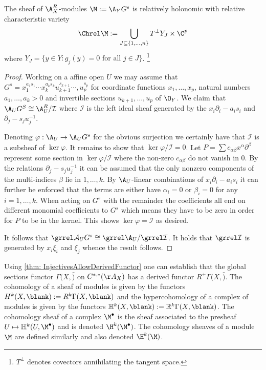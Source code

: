 \begin{lemma}\label{lem: RelHolGs}
  The sheaf of $\A_X^R$-modules $\M := \A_Y G^s$ is relatively holonomic with relative characteristic variety
  $$\Chrel \M := \bigcup_{J\subseteq \{1,\ldots, n\}} T^\perp Y_J \times \C^p $$
  where $Y_J = \{y\in Y: g_j(y) = 0  \text{ for all }j\in J \}$. \footnote{$T^\perp$ denotes covectors annihilating the tangent space. }
\end{lemma}
\begin{proof}
  Working on a affine open $U$ we may assume that $G^s=x_1^{a_1s_1}\cdots x_k^{a_k s_k} u_{k+1}^{s_{k+1}} \cdots, u_{p}^{s_p}$ for coordinate functions $x_1,\ldots, x_p$, natural numbers $a_1,\ldots, a_k>0$ and invertible sections $u_{k+1},\ldots,u_{p}$ of $\O_Y$.
  We claim that $\A_U G^S \cong \A_U^R/\mathcal{I}$ where $\mathcal{I}$ is the left ideal sheaf generated by the $x_i\partial_i - a_is_i$ and $\partial_{j} - s_{j}u_j^{-1}$.

  Denoting $\varphi:\A_U \to \A_U G^s$ for the obvious surjection we certainly have that $\mathcal{I}$ is a subsheaf of $\ker \varphi$.
  It remains to show that $\ker\varphi / \mathcal{I} = 0$.
  Let $P=\sum c_{\alpha \beta} x^\alpha \partial^\beta$ represent some section in $\ker \varphi/\mathcal{I}$ where the non-zero $c_{\alpha \beta}$ do not vanish in $0$.
  By the relations $\partial_{j} - s_{j}u_j^{-1}$ it can be assumed that the only nonzero components of the multi-indices $\beta$ lie in $1,\ldots, k$.
  By $\A_U$-linear combinations of $x_i \partial_i - a_is_i$ it can further be enforced that the terms are either have $\alpha_i = 0$ or $\beta_i = 0$ for any $i=1,\ldots, k$. When acting on $G^s$ with the remainder the coefficients all end on different monomial coefficients to $G^s$ which means they have to be zero in order for $P$ to be in the kernel. This shows $\ker\varphi = \mathcal{I}$ as desired.

  It follows that $\grrel \mathcal{A}_UG^s \cong \grrel\A_U /\grrel \mathcal{I}$. It holds that $\grrel \mathcal{I}$ is generated by $x_i \xi_i$ and $\xi_j$ whence the result follows.
\end{proof}


Using \cref{thm: InjectivesAllowDerivedFunctor} one can establish that the global sections functor $\Gamma(X,\bar)$ on $C^{*,*}(\AA_X)$ has a derived functor $R^+\Gamma(X,\bar)$.
The cohomology of a sheaf of modules is given by the functors $H^k(X,\blank) := R^k \Gamma(X,\blank)$ and the hypercohomology of a complex of modules is given by the functors $\mathbb{H}^k(X,\blank):= \mathbb{R}^k\Gamma(X,\blank)$.
The cohomology sheaf of a complex $\M^\bullet$ is the sheaf associated to the presheaf $U\mapsto \mathbb{H}^k(U,\M^\bullet)$ and is denoted $\H^k(\M^\bullet)$.
The cohomology sheaves of a module $\M$ are defined similarly and also denoted $\H^k(\M)$.

